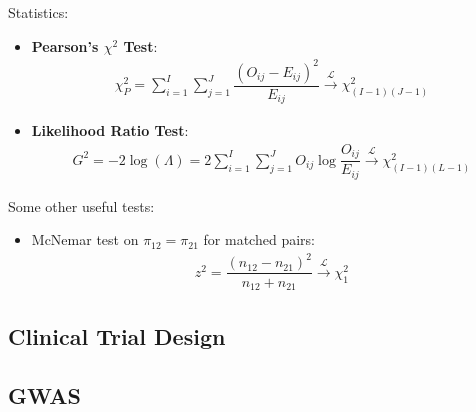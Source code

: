     Statistics:
    \begin{itemize}[topsep=2pt,itemsep=0pt]
        \item \textbf{Pearson's $ \chi^2 $ Test}:
        \begin{align}
            \chi^2_P=\sum_{i=1}^I\sum_{j=1}^J\dfrac{(O_{ij}-E_{ij})^2}{E_{ij}}\xrightarrow[]{\mathscr{L}} \chi^2_{(I-1)(J-1)}
        \end{align}
        
        
        \item \textbf{Likelihood Ratio Test}:
        \begin{align}
            G^2=-2\log(\Lambda )=2\sum_{i=1}^I\sum_{j=1}^JO_{ij}\log\dfrac{O_{ij}}{E_{ij}}\xrightarrow[]{\mathscr{L}} \chi^2_{(I-1)(L-1)} 
        \end{align}
    \end{itemize}
    
    Some other useful tests:
    \begin{itemize}[topsep=2pt,itemsep=0pt]
        \item McNemar test on $ \pi_{12}=\pi_{21} $ for matched pairs:
        \begin{align}
            z^2=\dfrac{(n_{12}-n_{21})^2}{{n_{12}+n_{21}}} \xrightarrow[]{\mathscr{L}} \chi^2_1
        \end{align}
        
        
    \end{itemize}
    
        

\subsection{Clinical Trial Design}
\subsection{GWAS}






